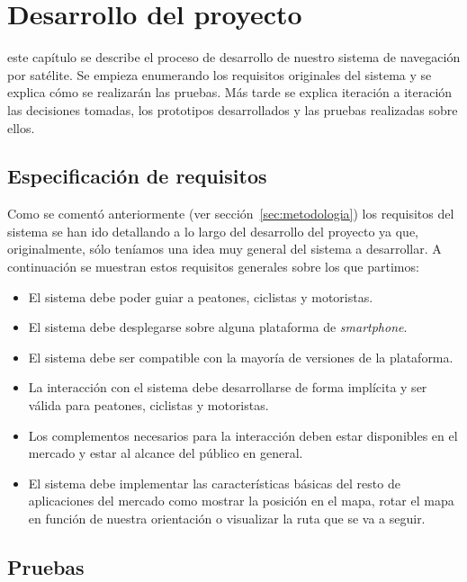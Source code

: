 \chapter{Desarrollo del proyecto}
\label{chap:desarrollo}

 este capítulo se describe el proceso de desarrollo de nuestro sistema de navegación por
satélite. Se empieza enumerando los requisitos originales del sistema y se explica cómo se
realizarán las pruebas. Más tarde se explica iteración a iteración las decisiones tomadas, los
prototipos desarrollados y las pruebas realizadas sobre ellos.

\section{Especificación de requisitos}

Como se comentó anteriormente (ver sección~\ref{sec:metodologia}) los requisitos del sistema se
han ido detallando a lo largo del desarrollo del proyecto ya que, originalmente, sólo teníamos una
idea muy general del sistema a desarrollar. A continuación se muestran estos requisitos generales
sobre los que partimos:

\begin{itemize}
  \item El sistema debe poder guiar a peatones, ciclistas y motoristas.
  \item El sistema debe desplegarse sobre alguna plataforma de \emph{smartphone}.
  \item El sistema debe ser compatible con la mayoría de versiones de la plataforma.
  \item La interacción con el sistema debe desarrollarse de forma implícita y ser válida para
    peatones, ciclistas y motoristas.
  \item Los complementos necesarios para la interacción deben estar disponibles en el
    mercado y estar al alcance del público en general.
  \item El sistema debe implementar las características básicas del resto de aplicaciones del
    mercado como mostrar la posición en el mapa, rotar el mapa en función de nuestra orientación o
    visualizar la ruta que se va a seguir.
\end{itemize}

\section{Pruebas}

